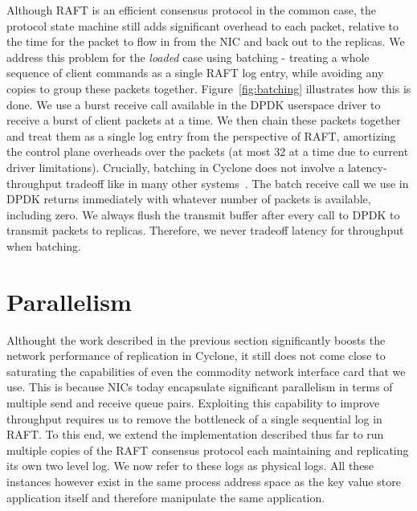 \documentclass[pageno]{jpaper}
\begin{document}
Although RAFT is an efficient consensus protocol in the common case, the
protocol state machine still adds significant overhead to each packet, relative
to the time for the packet to flow in from the NIC and back out to the replicas.
We address this problem for the \emph{loaded} case using batching - treating a
whole sequence of client commands as a single RAFT log entry, while avoiding any
copies to group these packets together. Figure~\ref{fig:batching} illustrates
how this is done. We use a burst receive call available in the DPDK userspace
driver to receive a burst of client packets at a time. We then chain these
packets together and treat them as a single log entry from the perspective of
RAFT, amortizing the control plane overheads over the packets (at most 32 at a
time due to current driver limitations). Crucially, batching in Cyclone does not
involve a latency-throughput tradeoff like in many other
systems~\cite{ix-dataplane}. The batch receive call we use in DPDK returns
immediately with whatever number of packets is available, including zero. We
always flush the transmit buffer after every call to DPDK to transmit packets to
replicas. Therefore, we never tradeoff latency for throughput when batching. 


\section{Parallelism}
\label{sec:parallelism}


Althought the work described in the previous section significantly boosts the
network performance of replication in Cyclone, it still does not come close to
saturating the capabilities of even the commodity network interface card that we
use. This is because NICs today encapsulate significant parallelism in terms of
multiple send and receive queue pairs. Exploiting this capability to improve
throughput requires us to remove the bottleneck of a single sequential log in
RAFT. To this end, we extend the implementation described thus far to run
multiple copies of the RAFT consensus protocol each maintaining and replicating
its own two level log. We now refer to these logs as physical logs. All these
instances however exist in the same process address space as the key value store
application itself and therefore manipulate the same application.
\end{document}
